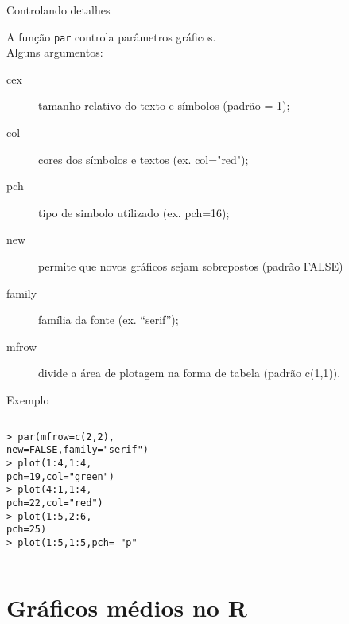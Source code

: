 \documentclass{beamer}
\begin{document}
\begin{frame}{Controlando detalhes}
 
A função \texttt{par} controla parâmetros gráficos. \\ \pause
Alguns argumentos:
\begin{description}
\item[cex] tamanho relativo do texto e símbolos (padrão = 1);
  \item[col] cores dos símbolos e textos (ex. col="red");
\item[pch] tipo de simbolo utilizado (ex. pch=16);
\item[new] permite que novos gráficos sejam sobrepostos (padrão FALSE)
\item[family] família da fonte (ex. ``serif'');
\item[mfrow] divide a área de plotagem  na forma de tabela (padrão c(1,1)).
\end{description}
\end{frame}

\begin{frame}{Exemplo}
 \begin{columns}
    \begin{column}{4cm}
\texttt{\small > par(mfrow=c(2,2),\\ new=FALSE,family="serif")\\ \vspace{10pt}
> plot(1:4,1:4,\\pch=19,col="green")\\ \vspace{10pt}
> plot(4:1,1:4,\\pch=22,col="red")\\ \vspace{10pt}
> plot(1:5,2:6,\\pch=25)\\ \vspace{10pt}
> plot(1:5,1:5,pch= "p"
}
    \end{column}

    \begin{column}{6cm}
    \end{column}
  \end{columns}
  
\end{frame}



\section{Gráficos médios no R}
\end{document}
